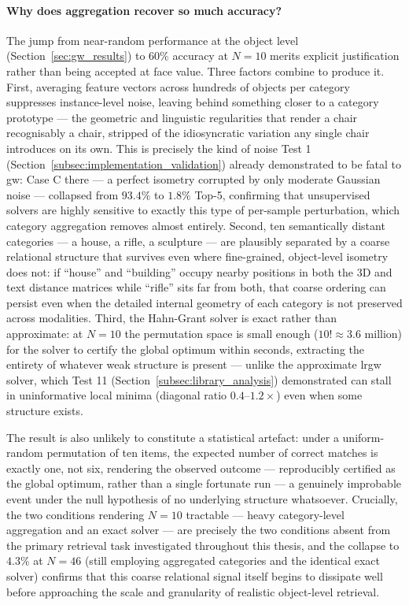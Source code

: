 \paragraph{Why does aggregation recover so much accuracy?} The jump from near-random performance at the object level (Section~\ref{sec:gw_results}) to $60\%$ accuracy at $N=10$ merits explicit justification rather than being accepted at face value. Three factors combine to produce it. First, averaging feature vectors across hundreds of objects per category suppresses instance-level noise, leaving behind something closer to a category prototype --- the geometric and linguistic regularities that render a chair recognisably a chair, stripped of the idiosyncratic variation any single chair introduces on its own. This is precisely the kind of noise Test 1 (Section~\ref{subsec:implementation_validation}) already demonstrated to be fatal to \gls{gw}: Case C there --- a perfect isometry corrupted by only moderate Gaussian noise --- collapsed from $93.4\%$ to $1.8\%$ Top-5, confirming that unsupervised solvers are highly sensitive to exactly this type of per-sample perturbation, which category aggregation removes almost entirely. Second, ten semantically distant categories --- a house, a rifle, a sculpture --- are plausibly separated by a coarse relational structure that survives even where fine-grained, object-level isometry does not: if ``house'' and ``building'' occupy nearby positions in both the 3D and text distance matrices while ``rifle'' sits far from both, that coarse ordering can persist even when the detailed internal geometry of each category is not preserved across modalities. Third, the Hahn-Grant solver is exact rather than approximate: at $N=10$ the permutation space is small enough ($10! \approx 3.6$ million) for the solver to certify the global optimum within seconds, extracting the entirety of whatever weak structure is present --- unlike the approximate \gls{lrgw} solver, which Test 11 (Section~\ref{subsec:library_analysis}) demonstrated can stall in uninformative local minima (diagonal ratio $0.4$--$1.2\times$) even when some structure exists.

The result is also unlikely to constitute a statistical artefact: under a uniform-random permutation of ten items, the expected number of correct matches is exactly one, not six, rendering the observed outcome --- reproducibly certified as the global optimum, rather than a single fortunate run --- a genuinely improbable event under the null hypothesis of no underlying structure whatsoever. Crucially, the two conditions rendering $N=10$ tractable --- heavy category-level aggregation and an exact solver --- are precisely the two conditions absent from the primary retrieval task investigated throughout this thesis, and the collapse to $4.3\%$ at $N=46$ (still employing aggregated categories and the identical exact solver) confirms that this coarse relational signal itself begins to dissipate well before approaching the scale and granularity of realistic object-level retrieval.